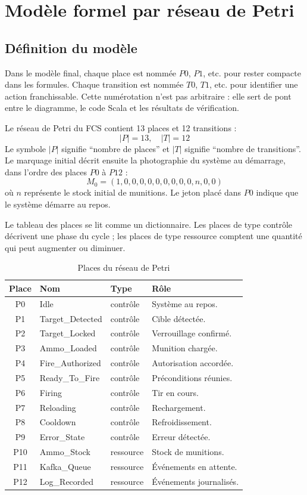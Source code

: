 \documentclass[11pt,a4paper]{report}
\begin{document}
\chapter{Modèle formel par réseau de Petri}

\section{Définition du modèle}
Dans le modèle final, chaque place est nommée $P0$, $P1$, etc. pour rester compacte dans les formules. Chaque transition est nommée $T0$, $T1$, etc. pour identifier une action franchissable. Cette numérotation n'est pas arbitraire : elle sert de pont entre le diagramme, le code Scala et les résultats de vérification.

Le réseau de Petri du FCS contient 13 places et 12 transitions :
\[
|P| = 13,\quad |T| = 12
\]
Le symbole $|P|$ signifie ``nombre de places'' et $|T|$ signifie ``nombre de transitions''. Le marquage initial décrit ensuite la photographie du système au démarrage, dans l'ordre des places $P0$ à $P12$ :
\[
M_0 = (1,0,0,0,0,0,0,0,0,0,n,0,0)
\]
où $n$ représente le stock initial de munitions. Le jeton placé dans $P0$ indique que le système démarre au repos.

Le tableau des places se lit comme un dictionnaire. Les places de type contrôle décrivent une phase du cycle ; les places de type ressource comptent une quantité qui peut augmenter ou diminuer.

\begin{table}[H]
\centering
\caption{Places du réseau de Petri}
\begin{tabularx}{\textwidth}{cllY}
\toprule
Place & Nom & Type & Rôle \\
\midrule
P0 & Idle & contrôle & Système au repos. \\
P1 & Target\_Detected & contrôle & Cible détectée. \\
P2 & Target\_Locked & contrôle & Verrouillage confirmé. \\
P3 & Ammo\_Loaded & contrôle & Munition chargée. \\
P4 & Fire\_Authorized & contrôle & Autorisation accordée. \\
P5 & Ready\_To\_Fire & contrôle & Préconditions réunies. \\
P6 & Firing & contrôle & Tir en cours. \\
P7 & Reloading & contrôle & Rechargement. \\
P8 & Cooldown & contrôle & Refroidissement. \\
P9 & Error\_State & contrôle & Erreur détectée. \\
P10 & Ammo\_Stock & ressource & Stock de munitions. \\
P11 & Kafka\_Queue & ressource & Événements en attente. \\
P12 & Log\_Recorded & ressource & Événements journalisés. \\
\bottomrule
\end{tabularx}
\end{table}
\end{document}
